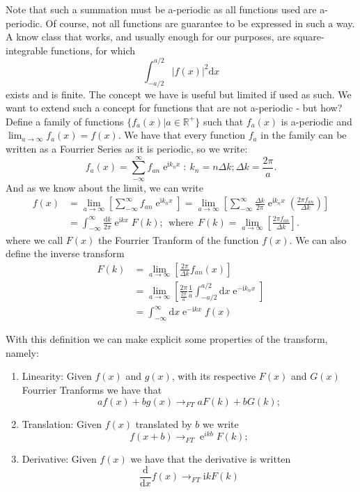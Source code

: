 \documentclass[]{report}
\DeclareMathOperator{\ee}{e}
\newcommand{\R}{\mathbb{R}}
\newcommand{\ii}{\mathrm{i}}
\newcommand{\dd}{\mathrm{d}}
\numberwithin{equation}{section} %
\begin{document}
Note that such a summation must be a-periodic as all functions used are a-periodic. Of course, not all functions are guarantee to be expressed in such a way. A know class that works, and usually enough for our purposes, are square-integrable functions, for which
$$
\int_{-a/2}^{a/2} |f(x)|^2 \dd x
$$
exists and is finite. The concept we have is useful but limited if used as such. We want to extend such a concept for functions that are not a-periodic - but how? Define a family of functions $\{f_a(x) | a \in \R^+\}$  such that $f_a(x)$ is a-periodic and $ \lim_{a \rightarrow \infty}f_a(x) = f(x)$. We have that every function $f_{a}$ in the family can be written as a Fourrier Series as it is periodic, so we write:
$$
f_a(x) = \sum_{-\infty}^{\infty} f_{an} \ee^{\ii k_n x}: \ k_n = n \Delta k; \Delta k = \frac{2\pi}{a}.
$$
And as we know about the limit, we can write
\begin{equation}
\begin{split}
	f(x) & = \lim_{a \rightarrow \infty} \left[ \sum_{-\infty}^{\infty} f_{an} \ee^{\ii k_n x} \right] = \lim_{a \rightarrow \infty} \left[ \sum_{-\infty}^{\infty} \frac{\Delta k}{2\pi} \ee^{\ii k_n x} \left( \frac{2\pi f_{an}}{\Delta k}\right) \right] \\
	& = \int_{-\infty}^{\infty} \frac{\dd k}{2\pi} \ee^{\ii k x} F(k); \ \ \text{where} \ \ F(k) = \lim_{a \rightarrow \infty} \left[ \frac{2\pi f_{an}}{\Delta k} \right].
\end{split} 
\end{equation}
where we call $F(x)$ the Fourrier Tranform of the function $f(x)$. We can also define the inverse transform 
\begin{equation}
	\begin{split}
		F(k) & = \lim_{a \rightarrow \infty} \left[ \frac{2\pi}{\Delta k} f_{an}(x) \right] \\
		& = \lim_{a \rightarrow \infty} \left[ \frac{2\pi}{\frac{2\pi}{a}} \frac{1}{a} \int_{-a/2}^{a/2} \dd x \ee^{- \ii k_n x} \right] \\
		& = \int_{-\infty}^{\infty} \dd x \ee^{- \ii k x} f(x)
	\end{split} 
\end{equation}

With this definition we can make explicit some properties of the transform, namely:

\begin{enumerate}
	\item Linearity: Given $f(x)$ and $g(x)$, with its respective $F(x)$ and $G(x)$ Fourrier Tranforms we have that $$a f(x) + b g(x) \rightarrow_{FT} a F(k) + b G(k);$$
	\item Translation: Given $f(x)$ translated by $b$ we write  $$f(x + b) \rightarrow_{FT} \ee^{ikb} F(k);$$
	\item Derivative: Given $f(x)$ we have that the derivative is written $$\frac{\dd}{\dd x}f(x) \rightarrow_{FT}  \ii k F(k)$$
\end{enumerate}
\end{document}
